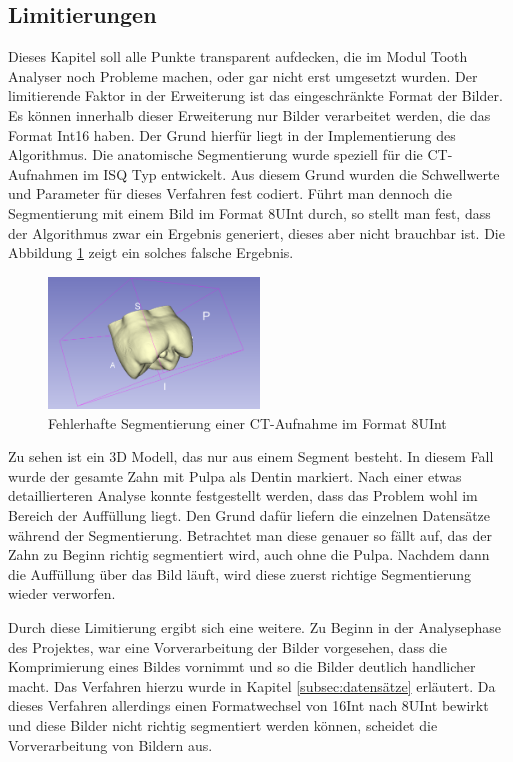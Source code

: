 \subsection{Limitierungen}
\label{sec:limitierungen} Dieses Kapitel soll alle Punkte transparent aufdecken,
die im Modul Tooth Analyser noch Probleme machen, oder gar nicht erst umgesetzt wurden.
Der limitierende Faktor in der Erweiterung ist das eingeschränkte Format der
Bilder. Es können innerhalb dieser Erweiterung nur Bilder verarbeitet werden,
die das Format \ac{Int16} haben. Der Grund hierfür liegt in der Implementierung
des Algorithmus. Die anatomische Segmentierung wurde speziell für die CT-Aufnahmen
im \ac{ISQ} Typ entwickelt. Aus diesem Grund wurden die Schwellwerte und Parameter
für dieses Verfahren fest codiert. Führt man dennoch die Segmentierung mit einem
Bild im Format \ac{8UInt} durch, so stellt man fest, dass der Algorithmus zwar ein
Ergebnis generiert, dieses aber nicht brauchbar ist. Die Abbildung \ref{fig:3d_error}
zeigt ein solches falsche Ergebnis.

\begin{figure}[h]
	\centering
	\includegraphics[width=0.5\textwidth]{img/3d_view_error.png}
	\caption{Fehlerhafte Segmentierung einer CT-Aufnahme im Format \ac{8UInt}}
	\label{fig:3d_error}
\end{figure}

Zu sehen ist ein 3D Modell, das nur aus einem Segment besteht. In diesem Fall
wurde der gesamte Zahn mit Pulpa als Dentin markiert. Nach einer etwas detaillierteren
Analyse konnte festgestellt werden, dass das Problem wohl im Bereich der
Auffüllung liegt. Den Grund dafür liefern die einzelnen Datensätze während der Segmentierung.
Betrachtet man diese genauer so fällt auf, das der Zahn zu Beginn richtig segmentiert
wird, auch ohne die Pulpa. Nachdem dann die Auffüllung über das Bild läuft, wird
diese zuerst richtige Segmentierung wieder verworfen.

Durch diese Limitierung ergibt sich eine weitere. Zu Beginn in der Analysephase des
Projektes, war eine Vorverarbeitung der Bilder vorgesehen, dass die Komprimierung
eines Bildes vornimmt und so die Bilder deutlich handlicher macht. Das Verfahren
hierzu wurde in Kapitel \ref{subsec:datensätze} erläutert. Da dieses Verfahren allerdings
einen Formatwechsel von \ac{16Int} nach \ac{8UInt} bewirkt und diese Bilder nicht
richtig segmentiert werden können, scheidet die Vorverarbeitung von Bildern aus.

